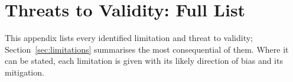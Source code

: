 \section{Threats to Validity: Full List}
\label{app:validity}

This appendix lists every identified limitation and threat to validity;
Section~\ref{sec:limitations} summarises the most consequential of them. Where
it can be stated, each limitation is given with its likely direction of bias
and its mitigation.

